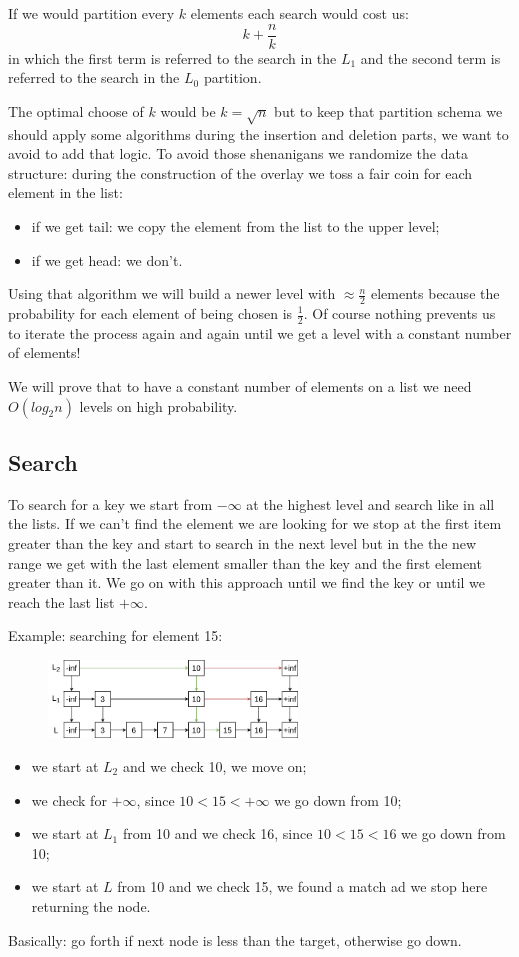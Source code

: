 If we would partition every $k$ elements each search would cost us:
$$
    k + \frac{n}{k}
$$
in which the first term is referred to the search in the $L_1$ and the second term is referred to the search in the $L_0$ partition.

The optimal choose of $k$ would be $k = \sqrt{n}$ but to keep that partition schema we should apply some algorithms during the insertion and deletion parts, we want to avoid to add that logic.
To avoid those shenanigans we randomize the data structure: during the construction of the overlay we toss a fair coin for each element in the list:
\begin{itemize}
    \item if we get tail: we copy the element from the list to the upper level;
    \item if we get head: we don't.
\end{itemize}
Using that algorithm we will build a newer level with $\approx \frac{n}{2}$ elements because the probability for each element of being chosen is $\frac{1}{2}$.
Of course nothing prevents us to iterate the process again and again until we get a level with a constant number of elements!

We will prove that to have a constant number of elements on a list we need $O(log_2 n)$ levels on high probability.

\subsection{Search}
To search for a key we start from $-\infty$ at the highest level and search like in all the lists. If we can't find the element we are looking for we stop at the first item greater than the key and start to search in the next level but in the the new range we get with the last element smaller than the key and the first element greater than it.
We go on with this approach until we find the key or until we reach the last list $+\infty$.

Example: searching for element 15:
\begin{figure}[H]
    \centering
    \includegraphics[width=250px]{images/4_Randomized_data_structures/skip_list_search.png}
\end{figure}
\begin{itemize}
    \item we start at $L_2$ and we check 10, we move on;
    \item we check for $+\infty$, since $10 < 15 < +\infty$ we go down from 10;
    \item we start at $L_1$ from 10 and we check 16, since $10 < 15 < 16$ we go down from 10;
    \item we start at $L$ from 10 and we check 15, we found a match ad we stop here returning the node.
\end{itemize}
Basically: go forth if next node is less than the target, otherwise go down.

